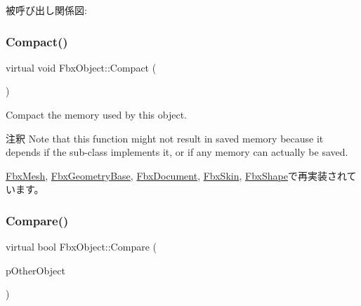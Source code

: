 被呼び出し関係図\+:
\mbox{\label{class_fbx_object_a2720f16a08150d162242b0c59f58c3dc}} 
\subsubsection{\texorpdfstring{Compact()}{Compact()}}
{\footnotesize\ttfamily virtual void Fbx\+Object\+::\+Compact (\begin{DoxyParamCaption}{ }\end{DoxyParamCaption})\hspace{0.3cm}{\ttfamily [virtual]}}

Compact the memory used by this object. \begin{DoxyRemark}{注釈}
Note that this function might not result in saved memory because it depends if the sub-\/class implements it, or if any memory can actually be saved. 
\end{DoxyRemark}


\hyperlink{class_fbx_mesh_a05ca6a8fbd028777c91931ce6edf4b19}{Fbx\+Mesh}, \hyperlink{class_fbx_geometry_base_a66146155ecad4e6f6f2e8cf52e0340f6}{Fbx\+Geometry\+Base}, \hyperlink{class_fbx_document_a62a41699423c0431a1e0969e9dea176d}{Fbx\+Document}, \hyperlink{class_fbx_skin_a3c794b4a2f5e83725ea2f3b2b7b2d45c}{Fbx\+Skin}, \hyperlink{class_fbx_shape_a9c3c948d3646bf78472164860ad11d65}{Fbx\+Shape}で再実装されています。

\mbox{\label{class_fbx_object_a49a593ea33e629adfac89c3238838144}} 
\subsubsection{\texorpdfstring{Compare()}{Compare()}}
{\footnotesize\ttfamily virtual bool Fbx\+Object\+::\+Compare (\begin{DoxyParamCaption}\item[{\hyperlink{class_fbx_object}{Fbx\+Object} $\ast$}]{p\+Other\+Object }\end{DoxyParamCaption})\hspace{0.3cm}{\ttfamily [virtual]}}

\mbox{\label{class_fbx_object_a3c7e883121fe1ceb271381146bd52ed0}} 
